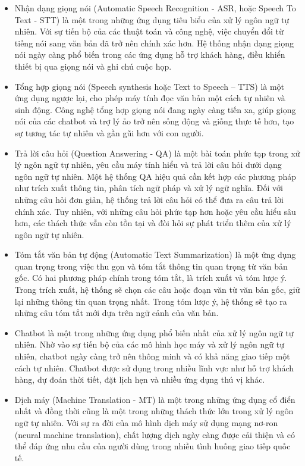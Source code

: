 \begin{itemize}
    \item Nhận dạng giọng nói (Automatic Speech Recognition - ASR, hoặc Speech To Text - STT) là một trong những ứng dụng tiêu biểu của xử lý ngôn ngữ tự nhiên. Với sự tiến bộ của các thuật toán và công nghệ, việc chuyển đổi từ tiếng nói sang văn bản đã trở nên chính xác hơn. Hệ thống nhận dạng giọng nói ngày càng phổ biến trong các ứng dụng hỗ trợ khách hàng, điều khiển thiết bị qua giọng nói và ghi chú cuộc họp.
    \item Tổng hợp giọng nói (Speech synthesis hoặc Text to Speech – TTS) là một ứng dụng ngược lại, cho phép máy tính đọc văn bản một cách tự nhiên và sinh động. Công nghệ tổng hợp giọng nói đang ngày càng tiến xa, giúp giọng nói của các chatbot và trợ lý ảo trở nên sống động và giống thực tế hơn, tạo sự tương tác tự nhiên và gần gũi hơn với con người.
    \item Trả lời câu hỏi (Question Answering - QA) là một bài toán phức tạp trong xử lý ngôn ngữ tự nhiên, yêu cầu máy tính hiểu và trả lời câu hỏi dưới dạng ngôn ngữ tự nhiên. Một hệ thống QA hiệu quả cần kết hợp các phương pháp như trích xuất thông tin, phân tích ngữ pháp và xử lý ngữ nghĩa. Đối với những câu hỏi đơn giản, hệ thống trả lời câu hỏi có thể đưa ra câu trả lời chính xác. Tuy nhiên, với những câu hỏi phức tạp hơn hoặc yêu cầu hiểu sâu hơn, các thách thức vẫn còn tồn tại và đòi hỏi sự phát triển thêm của xử lý ngôn ngữ tự nhiên. 
    \item Tóm tắt văn bản tự động (Automatic Text Summarization) là một ứng dụng quan trọng trong việc thu gọn và tóm tắt thông tin quan trọng từ văn bản gốc. Có hai phương pháp chính trong tóm tắt, là trích xuất và tóm lược ý. Trong trích xuất, hệ thống sẽ chọn các câu hoặc đoạn văn từ văn bản gốc, giữ lại những thông tin quan trọng nhất. Trong tóm lược ý, hệ thống sẽ tạo ra những câu tóm tắt mới dựa trên ngữ cảnh của văn bản. 
    \item Chatbot là một trong những ứng dụng phổ biến nhất của xử lý ngôn ngữ tự nhiên. Nhờ vào sự tiến bộ của các mô hình học máy và xử lý ngôn ngữ tự nhiên, chatbot ngày càng trở nên thông minh và có khả năng giao tiếp một cách tự nhiên. Chatbot được sử dụng trong nhiều lĩnh vực như hỗ trợ khách hàng, dự đoán thời tiết, đặt lịch hẹn và nhiều ứng dụng thú vị khác. 
    \item Dịch máy (Machine Translation - MT) là một trong những ứng dụng cổ điển nhất và đồng thời cũng là một trong những thách thức lớn trong xử lý ngôn ngữ tự nhiên. Với sự ra đời của mô hình dịch máy sử dụng mạng nơ-ron (neural machine translation), chất lượng dịch ngày càng được cải thiện và có thể đáp ứng nhu cầu của người dùng trong nhiều tình huống giao tiếp quốc tế. 

\end{itemize}
